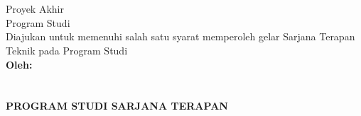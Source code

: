 \begin{titlepage}
    \begin{center}

        \begin{doublespace}
            \textbf{\MakeUppercase{\large{\tipe}}}\\[0.5cm]\textbf{\MakeUppercase{\normalsize{\judulid}}}\\[3cm]
            
        \end{doublespace}
        Proyek Akhir\\
        Program Studi {\prodi} \\[2cm]
        Diajukan untuk memenuhi salah satu syarat memperoleh gelar Sarjana Terapan Teknik pada Program Studi {\prodi} {\departemen} {\fakultas} {\universitas}\\[3cm]
        

        \textbf{\normalsize {Oleh:}} \\
        \textbf{\normalsize \MakeUppercase{\underline{\penulis}}} \\
        \textbf{\normalsize \MakeUppercase{{\nim}}} \\[3cm]


        \textbf{\normalsize \MakeUppercase{Program Studi Sarjana Terapan\\ \prodi}}\\
        \textbf{\normalsize \MakeUppercase{\departemen}}\\
        \textbf{\normalsize \MakeUppercase{\fakultas}}\\
        \textbf{\normalsize \MakeUppercase{\universitas}}\\
        \textbf{\normalsize \the\year{}}\\
    \end{center}
\end{titlepage}